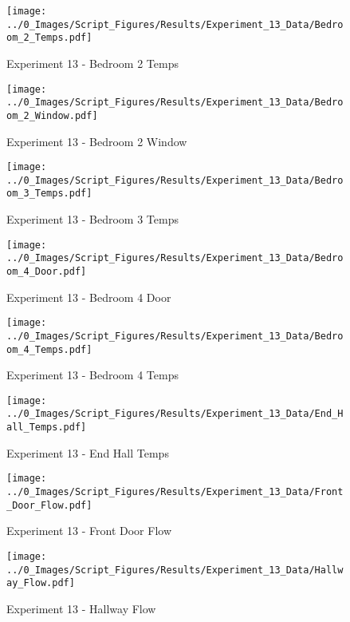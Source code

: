 	\begin{figure}[H]
		\centering
		\texttt{[image: ../0\_Images/Script\_Figures/Results/Experiment\_13\_Data/Bedroom\_2\_Temps.pdf]}
		\caption[]{Experiment 13 - Bedroom 2 Temps}
	\end{figure}
 
	\clearpage

	\begin{figure}[H]
		\centering
		\texttt{[image: ../0\_Images/Script\_Figures/Results/Experiment\_13\_Data/Bedroom\_2\_Window.pdf]}
		\caption[]{Experiment 13 - Bedroom 2 Window}
	\end{figure}
 

	\begin{figure}[H]
		\centering
		\texttt{[image: ../0\_Images/Script\_Figures/Results/Experiment\_13\_Data/Bedroom\_3\_Temps.pdf]}
		\caption[]{Experiment 13 - Bedroom 3 Temps}
	\end{figure}
 
	\clearpage

	\begin{figure}[H]
		\centering
		\texttt{[image: ../0\_Images/Script\_Figures/Results/Experiment\_13\_Data/Bedroom\_4\_Door.pdf]}
		\caption[]{Experiment 13 - Bedroom 4 Door}
	\end{figure}
 

	\begin{figure}[H]
		\centering
		\texttt{[image: ../0\_Images/Script\_Figures/Results/Experiment\_13\_Data/Bedroom\_4\_Temps.pdf]}
		\caption[]{Experiment 13 - Bedroom 4 Temps}
	\end{figure}
 
	\clearpage

	\begin{figure}[H]
		\centering
		\texttt{[image: ../0\_Images/Script\_Figures/Results/Experiment\_13\_Data/End\_Hall\_Temps.pdf]}
		\caption[]{Experiment 13 - End Hall Temps}
	\end{figure}
 

	\begin{figure}[H]
		\centering
		\texttt{[image: ../0\_Images/Script\_Figures/Results/Experiment\_13\_Data/Front\_Door\_Flow.pdf]}
		\caption[]{Experiment 13 - Front Door Flow}
	\end{figure}
 
	\clearpage

	\begin{figure}[H]
		\centering
		\texttt{[image: ../0\_Images/Script\_Figures/Results/Experiment\_13\_Data/Hallway\_Flow.pdf]}
		\caption[]{Experiment 13 - Hallway Flow}
	\end{figure}
 

